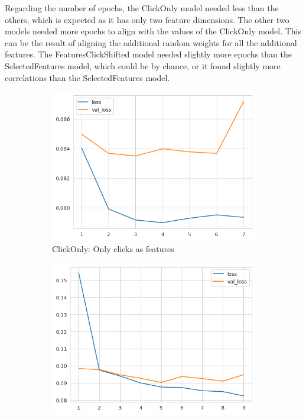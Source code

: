 Regarding the number of epochs, the ClickOnly model needed less than the others, which is expected as it has only two feature dimensions.
The other two models needed more epochs to align with the values of the ClickOnly model.
This can be the result of aligning the additional random weights for all the additional features.
The FeaturesClickShifted model needed slightly more epochs than the SelectedFeatures model, which could be by chance, or it found slightly more correlations than the SelectedFeatures model.
%

\begin{figure}[htbp!]
  \centering
  \begin{subfigure}[b]{0.45\textwidth}
    \centering
    \includegraphics[width=\textwidth]{graphics/model_history_loss_clicks}
    \caption{ClickOnly: Only clicks as features}
    \label{fig:model_history_loss_clicks}
  \end{subfigure}
  \hfill
  \begin{subfigure}[b]{0.45\textwidth}
    \centering
    \includegraphics[width=\textwidth]{graphics/model_history_loss_features}

\end{subfigure}
\end{figure}
